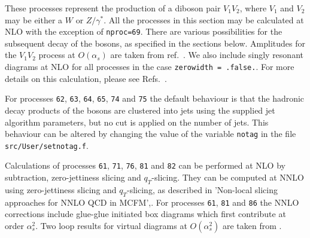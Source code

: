 \label{subsec:diboson}

These processes represent the production of a diboson pair $V_1 V_2$,
where $V_1$ and $V_2$ may be either a $W$ or $Z/\gamma^*$.
All the processes in this section may be calculated at NLO with the exception
of {\tt nproc=69}. There are various
possibilities for the subsequent decay of the bosons, as specified in the
sections below. Amplitudes for the $V_1 V_2$ process at $O(\alpha_s)$
are taken from ref.~\cite{Dixon:1998py}.
We also include singly resonant diagrams at NLO for all processes
in the case {\tt zerowidth = .false.}.
For more details on this calculation, please see
Refs.~\cite{Campbell:1999ah,Campbell:2011bn}.

For processes {\tt 62}, {\tt 63}, {\tt 64}, {\tt 65}, {\tt 74}
and {\tt 75} the default behaviour is that the hadronic decay products
of the bosons are clustered into jets using the supplied jet
algorithm parameters, but no cut is applied on the number of jets.
This behaviour can be altered by changing the value of the
variable {\tt notag} in the file \verb|src/User/setnotag.f|.

Calculations of processes {\tt 61}, {\tt 71}, {\tt 76}, {\tt 81} and {\tt 82}
can be performed at NLO by subtraction, zero-jettiness slicing and $q_T$-slicing.
They can be computed at NNLO using  zero-jettiness slicing and $q_T$-slicing,
as described in 'Non-local slicing approaches for NNLO QCD in MCFM',\cite{Campbell:2022gdq}.
For processes {\tt 61}, {\tt 81} and {\tt 86} the NNLO corrections
include glue-glue initiated box diagrams which first contribute at order $\alpha_s^2$.
Two loop results for virtual diagrams at $O(\alpha_s^2)$ are taken from \cite{Gehrmann:2015ora}.

  
